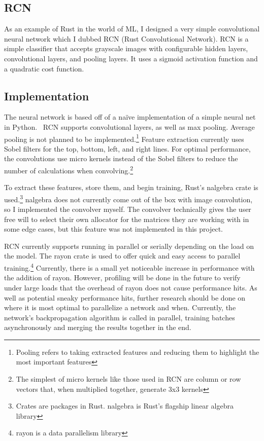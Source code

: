 \begin{multicols}{2}
\section{RCN}
As an example of Rust in the world of ML, I designed a very simple convolutional neural network which I dubbed RCN (Rust
Convolutional Network). RCN is a simple classifier that accepts grayscale images with configurable hidden layers,
convolutional layers, and pooling layers. It uses a sigmoid activation function and a quadratic cost function.

\subsection{Implementation}
The neural network is based off of a na\"ive implementation of a simple neural net in Python.~\cite{nnanddeeplearning}
RCN supports convolutional layers, as well as max pooling. Average pooling is not planned to be implemented.\footnote{
Pooling refers to taking extracted features and reducing them to highlight the most important features} Feature extraction
currently uses Sobel filters for the top, bottom, left, and right lines. For optimal performance, the convolutions use
micro kernels instead of the Sobel filters to reduce the number of calculations when convolving.\footnote{The simplest
of micro kernels like those used in RCN are column or row vectors that, when multiplied together, generate 3x3 kernels}

To extract these features, store them, and begin training, Rust's nalgebra crate is used.\footnote{Crates are packages
in Rust. nalgebra is Rust's flagship linear algebra library} nalgebra does not currently come out of the box with image
convolution, so I implemented the convolver myself. The convolver technically gives the user free will to select their
own allocator for the matrices they are working with in some edge cases, but this feature was not implemented in this project.

RCN currently supports running in parallel or serially depending on the load on the model. The rayon crate is used to offer quick and
easy access to parallel training.\footnote{rayon is a data parallelism library}
Currently, there is a small yet noticeable increase in performance with the addition of rayon. However, profiling will be
done in the future to verify under large loads that the overhead of rayon does not cause performance hits. As well as potential
sneaky performance hits, further research should be done on where it is most optimal to parallelize a network and when.
Currently, the network's backpropagation algorithm is called in parallel, training batches asynchronously and merging the results
together in the end.


\end{multicols}
